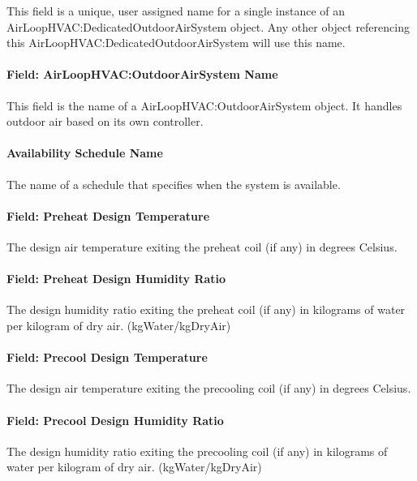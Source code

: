 This field is a unique, user assigned name for a single instance of an AirLoopHVAC:DedicatedOutdoorAirSystem object. Any other object referencing this AirLoopHVAC:DedicatedOutdoorAirSystem will use this name.

\paragraph{Field: AirLoopHVAC:OutdoorAirSystem Name}\label{field-airLoophvac-outdoorairsystem-name}

This field is the name of a AirLoopHVAC:OutdoorAirSystem object. It handles outdoor air based on its own controller.

\paragraph{Availability Schedule Name}\label{availability-schedule-name}

The name of a schedule that specifies when the system is available.

\paragraph{Field: Preheat Design Temperature}

The design air temperature exiting the preheat coil (if any) in degrees Celsius.

\paragraph{Field: Preheat Design Humidity Ratio}

The design humidity ratio exiting the preheat coil (if any) in kilograms of water per kilogram of dry air. (kgWater/kgDryAir)

\paragraph{Field: Precool Design Temperature}

The design air temperature exiting the precooling coil (if any) in degrees Celsius.

\paragraph{Field: Precool Design Humidity Ratio}

The design humidity ratio exiting the precooling coil (if any) in kilograms of water per kilogram of dry air. (kgWater/kgDryAir)

